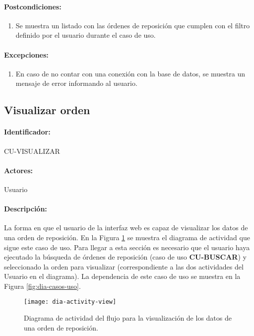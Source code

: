 \paragraph{Postcondiciones:}
\begin{enumerate}
  \item Se muestra un listado con las órdenes de reposición que cumplen con el filtro definido por el usuario durante el caso de uso.
\end{enumerate}
\paragraph{Excepciones:}
\begin{enumerate}
  \item En caso de no contar con una conexión con la base de datos, se muestra un mensaje de error informando al usuario.
\end{enumerate}


\subsection{Visualizar orden}\label{cu-visualizar}
\paragraph{Identificador:}
CU-VISUALIZAR
\paragraph{Actores:}
Usuario
\paragraph{Descripción:}
La forma en que el usuario de la interfaz web es capaz de visualizar los datos de una orden de reposición. En la Figura \ref{fig:dia-activity-view} se muestra el diagrama de actividad que sigue este caso de uso. Para llegar a esta sección es necesario que el usuario haya ejecutado la búsqueda de órdenes de reposición (caso de uso \textbf{CU-BUSCAR}) y seleccionado la orden para visualizar (correspondiente a las dos actividades del Usuario en el diagrama). La dependencia de este caso de uso se muestra en la Figura \ref{fig:dia-casos-uso}.
\begin{figure}[h]
  \centering
  \texttt{[image: dia-activity-view]}
  \caption{Diagrama de actividad del flujo para la visualización de los datos de una orden de reposición.}
  \label{fig:dia-activity-view}
\end{figure}
